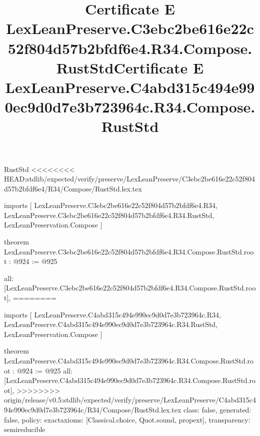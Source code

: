 \begin{lexlean}{RustStd}
<<<<<<<< HEAD:stdlib/expected/verify/preserve/LexLeanPreserve/C3ebc2be616e22c52f804d57b2bfdf6e4/R34/Compose/RustStd.lex.tex
\title{Certificate E LexLeanPreserve.C3ebc2be616e22c52f804d57b2bfdf6e4.R34.Compose.RustStd}
\begin{coremodule}
imports [
  LexLeanPreserve.C3ebc2be616e22c52f804d57b2bfdf6e4.R34,
  LexLeanPreserve.C3ebc2be616e22c52f804d57b2bfdf6e4.R34.RustStd,
  LexLeanPreservation.Compose
]

theorem LexLeanPreserve.C3ebc2be616e22c52f804d57b2bfdf6e4.R34.Compose.RustStd.root : @924 := @925 {
  all: [LexLeanPreserve.C3ebc2be616e22c52f804d57b2bfdf6e4.R34.Compose.RustStd.root],
========
\title{Certificate E LexLeanPreserve.C4abd315c494e990ec9d0d7e3b723964c.R34.Compose.RustStd}
\begin{coremodule}
imports [
  LexLeanPreserve.C4abd315c494e990ec9d0d7e3b723964c.R34,
  LexLeanPreserve.C4abd315c494e990ec9d0d7e3b723964c.R34.RustStd,
  LexLeanPreservation.Compose
]

theorem LexLeanPreserve.C4abd315c494e990ec9d0d7e3b723964c.R34.Compose.RustStd.root : @924 := @925 {
  all: [LexLeanPreserve.C4abd315c494e990ec9d0d7e3b723964c.R34.Compose.RustStd.root],
>>>>>>>> origin/release/v0.5:stdlib/expected/verify/preserve/LexLeanPreserve/C4abd315c494e990ec9d0d7e3b723964c/R34/Compose/RustStd.lex.tex
  class: false,
  generated: false,
  policy: exact{axioms: [Classical.choice, Quot.sound, propext]},
  transparency: semireducible
}


\end{coremodule}}
\end{coremodule}
\end{lexlean}
